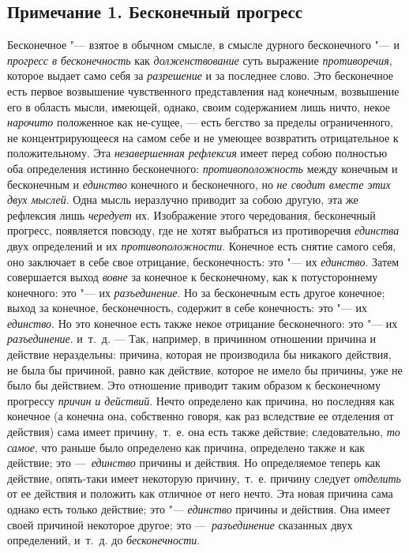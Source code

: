 \subsection*{Примечание 1. Бесконечный прогресс}

Бесконечное "--- взятое в обычном смысле, в смысле дурного бесконечного "--- и
{\em прогресс в бесконечность} как
{\em долженствование} суть выражение
{\em противоречия}, которое выдает само себя за
{\em разрешение} и за последнее слово. Это бесконечное
есть первое возвышение чувственного представления над конечным, возвышение
его в область мысли, имеющей, однако, своим содержанием лишь ничто, некое
{\em нарочито} положенное как не-сущее, — есть бегство
за пределы ограниченного, не концентрирующееся на самом себе и не умеющее
возвратить отрицательное к положительному. Эта
{\em незавершенная рефлексия} имеет перед собою
полностью оба определения истинно бесконечного:
{\em противоположность} между конечным и бесконечным и
{\em единство} конечного и бесконечного, но
{\em не сводит вместе этих двух мыслей}. Одна мысль
неразлучно приводит за собою другую, эта же рефлексия лишь
{\em чередует} их. Изображение этого чередования,
бесконечный прогресс, появляется повсюду, где не хотят выбраться из
противоречия {\em единства} двух определений и их
{\em противоположности}. Конечное есть снятие самого
себя, оно заключает в себе свое отрицание, бесконечность: это "--- их
{\em единство}. Затем совершается выход
{\em вовне} за конечное к бесконечному, как к
потустороннему конечного: это "--- их {\em разъединение}.
Но за бесконечным есть другое конечное; выход за конечное, бесконечность,
содержит в себе конечность: это "--- их {\em единство}. Но
это конечное есть также некое отрицание бесконечного: это "--- их
{\em разъединение}. и~т.~д. — Так, например, в
причинном отношении причина и действие нераздельны: причина, которая не
производила бы никакого действия, не была бы причиной, равно как действие,
которое не имело бы причины, уже не было бы действием. Это отношение
приводит таким образом к бесконечному прогрессу
{\em причин и действий}. Нечто определено как причина,
но последняя как конечное (а конечна она, собственно говоря, как раз
вследствие ее отделения от действия) сама имеет причину,~т.~е. она есть
также действие; следовательно, {\em то самое}, что
раньше было определено как причина, определено также и как действие; это
—~{\em единство} причины и действия. Но определяемое
теперь как действие, опять-таки имеет некоторую причину,~т.~е. причину
следует {\em отделить} от ее действия и положить как
отличное от него нечто. Эта новая причина сама однако есть только действие;
это "--- {\em единство} причины и действия. Она имеет
своей причиной некоторое другое; это
—~{\em разъединение} сказанных двух определений,
и~т.~д. до {\em бесконечности}.

